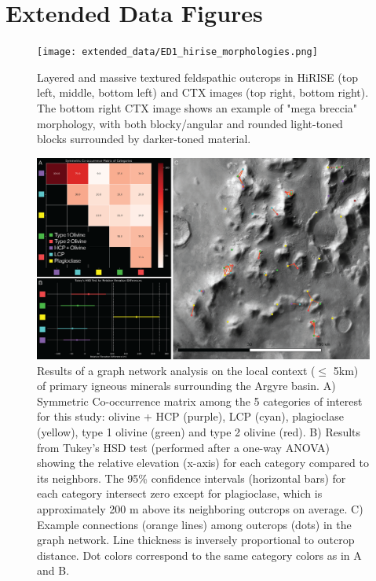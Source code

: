 \documentclass[12pt]{article}
\newenvironment{figurehere}[1][0.85]
  {\begin{figure}[p]
   \begin{minipage}[c][0.80\textheight][c]{\linewidth}
   \centering
   \setlength{\textfloatsep}{0pt}}
  {\end{minipage}
   \end{figure}}
\begin{document}
\setlength{\parindent}{0em} %

\vspace*{\fill}
\section*{\centering Extended Data Figures}
\vspace*{\fill}

\newpage

\begin{figurehere}
    \texttt{[image: extended\_data/ED1\_hirise\_morphologies.png]}
    \caption[Layered and massive textured feldspathic outcrops in HiRISE and CTX images.]{Layered and massive textured feldspathic outcrops in HiRISE (top left, middle, bottom left) and CTX images (top right, bottom right). The bottom right CTX image shows an example of "mega breccia" morphology, with both blocky/angular and rounded light-toned blocks surrounded by darker-toned material.}
    \label{fig:extended_data_figure1}
\end{figurehere}

\clearpage

\begin{figurehere}
    \includegraphics[width=\textwidth]{extended_data/ED2_local_relationships.png}
    \caption[Results of a graph network analysis on the local context of primary igneous minerals.]{Results of a graph network analysis on the local context ($\leq$ 5km) of primary igneous minerals surrounding the Argyre basin. A) Symmetric Co-occurrence matrix among the 5 categories of interest for this study: olivine + HCP (purple), LCP (cyan), plagioclase (yellow), type 1 olivine (green) and type 2 olivine (red). B) Results from Tukey's HSD test (performed after a one-way ANOVA) showing the relative elevation (x-axis) for each category compared to its neighbors. The 95\% confidence intervals (horizontal bars) for each category intersect zero except for plagioclase, which is approximately 200 m above its neighboring outcrops on average. C) Example connections (orange lines) among outcrops (dots) in the graph network. Line thickness is inversely proportional to outcrop distance. Dot colors correspond to the same category colors as in A and B.}
    \label{fig:extended_data_figure2}
\end{figurehere}
\end{document}
